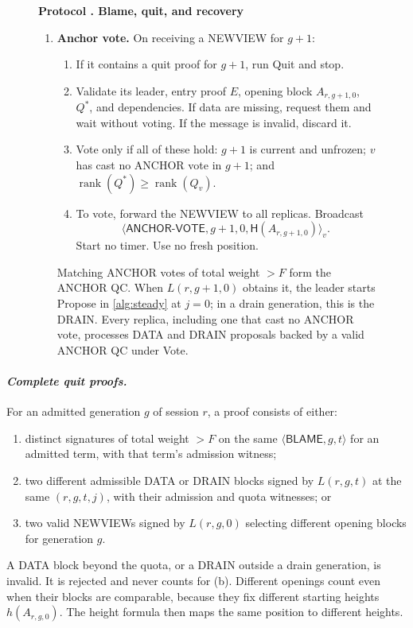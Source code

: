 \documentclass[11pt,a4paper]{article}
\newcommand{\RR}[1]{{\color{rrRed}#1}}
\newcommand{\Hash}{\mathsf H}
\newcommand{\rank}{\operatorname{rank}}
\newcommand{\tagg}[1]{\ensuremath{\mathsf{#1}}}
\newcommand{\defterm}[1]{\textcolor{rrBlue}{\textit{#1}}}
\newcounter{protocol}
\newenvironment{protocol}[2]{\begin{figure}[htbp]\refstepcounter{protocol}\label{#1}
\begin{mdframed}[linewidth=.6pt,skipabove=0pt,skipbelow=0pt,
innertopmargin=7pt,innerbottommargin=7pt]\small
\textbf{Protocol \theprotocol. #2}\par\smallskip}{\end{mdframed}\end{figure}}
\begin{document}
\begin{protocol}{alg:recovery}{Blame, quit, and recovery}
\begin{enumerate}[label=\textbf{\arabic*)},itemsep=3pt]
\item \textbf{Anchor vote.} On receiving a NEWVIEW for $g+1$:
 \begin{enumerate}[label=(\alph*)]
 \item If it contains a quit proof for $g+1$, run Quit and stop.
 \item Validate its leader, entry proof $E$, opening block $A_{r,g+1,0}$,
       $Q^*$, and dependencies. If data are missing, request them and
       wait without voting. If the message is invalid, discard it.
 \item Vote only if all of these hold: $g+1$ is current and unfrozen; $v$
       has cast no ANCHOR vote in $g+1$; and $\rank(Q^*)\ge\rank(Q_v)$.
 \item To vote, forward the NEWVIEW to all replicas. Broadcast
       \[\langle\tagg{ANCHOR\mbox{-}VOTE},g+1,0,\Hash(A_{r,g+1,0})\rangle_v.\]
       Start no timer. Use no fresh position.
 \end{enumerate}
 Matching ANCHOR votes \RR{of total weight $>F$} form the ANCHOR QC.
 When $L(r,g+1,0)$ obtains it, the leader starts Propose in
 \cref{alg:steady} at $j=0$\RR{; in a drain generation, this is the
 DRAIN}. Every replica, including one that cast no ANCHOR vote,
 processes DATA \RR{and DRAIN} proposals backed by a valid ANCHOR QC
 under Vote.
\end{enumerate}
\end{protocol}

\paragraph{\defterm{Complete quit proofs.}}
For an admitted generation $g$ \RR{of session $r$}, a proof consists of
either:
\begin{enumerate}[label=(\alph*)]
\item distinct signatures \RR{of total weight $>F$} on the same
$\langle\tagg{BLAME},g,t\rangle$ for an admitted term, with that term's
admission witness;
\item two different admissible DATA \RR{or DRAIN} blocks signed by
$L(r,g,t)$ at the same $(r,g,t,j)$, with their admission \RR{and quota}
witnesses; or
\item two valid NEWVIEWs signed by $L(r,g,0)$ selecting different opening
blocks for generation $g$.
\end{enumerate}
\RR{A DATA block beyond the quota, or a DRAIN outside a drain generation,
is invalid. It is rejected and never counts for (b).}
Different openings count even when their blocks are comparable, because
they fix different starting heights $h(A_{r,g,0})$. The height formula then
maps the same position to different heights.
\end{document}
